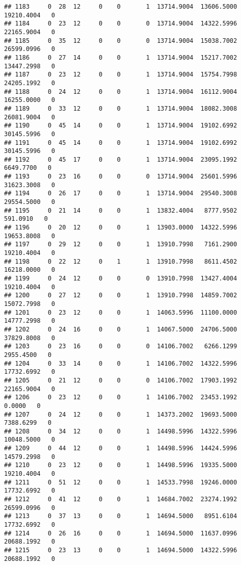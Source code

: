 \documentclass[
]{article}
\begin{document}
\begin{enumerate}
\begin{verbatim}
## 1183     0  28  12     0    0       1  13714.9004  13606.5000  19210.4004   0
## 1184     0  23  12     0    0       0  13714.9004  14322.5996  22165.9004   0
## 1185     0  35  12     0    0       0  13714.9004  15038.7002  26599.0996   0
## 1186     0  27  14     0    0       1  13714.9004  15217.7002  13447.2998   0
## 1187     0  23  12     0    0       1  13714.9004  15754.7998  24205.1992   0
## 1188     0  24  12     0    0       1  13714.9004  16112.9004  16255.0000   0
## 1189     0  33  12     0    0       1  13714.9004  18082.3008  26081.9004   0
## 1190     0  45  14     0    0       1  13714.9004  19102.6992  30145.5996   0
## 1191     0  45  14     0    0       1  13714.9004  19102.6992  30145.5996   0
## 1192     0  45  17     0    0       1  13714.9004  23095.1992   6649.7700   0
## 1193     0  23  16     0    0       0  13714.9004  25601.5996  31623.3008   0
## 1194     0  26  17     0    0       1  13714.9004  29540.3008  29554.5000   0
## 1195     0  21  14     0    0       1  13832.4004   8777.9502    591.0910   0
## 1196     0  20  12     0    0       1  13903.0000  14322.5996  19653.8008   0
## 1197     0  29  12     0    0       1  13910.7998   7161.2900  19210.4004   0
## 1198     0  22  12     0    1       1  13910.7998   8611.4502  16218.0000   0
## 1199     0  24  12     0    0       0  13910.7998  13427.4004  19210.4004   0
## 1200     0  27  12     0    0       1  13910.7998  14859.7002  15072.7998   0
## 1201     0  23  12     0    0       1  14063.5996  11100.0000  14777.2998   0
## 1202     0  24  16     0    0       1  14067.5000  24706.5000  37829.8008   0
## 1203     0  23  16     0    0       0  14106.7002   6266.1299   2955.4500   0
## 1204     0  33  14     0    0       1  14106.7002  14322.5996  17732.6992   0
## 1205     0  21  12     0    0       0  14106.7002  17903.1992  22165.9004   0
## 1206     0  23  12     0    0       1  14106.7002  23453.1992      0.0000   0
## 1207     0  24  12     0    0       1  14373.2002  19693.5000   7388.6299   0
## 1208     0  34  12     0    0       1  14498.5996  14322.5996  10048.5000   0
## 1209     0  44  12     0    0       1  14498.5996  14424.5996  14579.2998   0
## 1210     0  23  12     0    0       1  14498.5996  19335.5000  19210.4004   0
## 1211     0  51  12     0    0       1  14533.7998  19246.0000  17732.6992   0
## 1212     0  41  12     0    0       1  14684.7002  23274.1992  26599.0996   0
## 1213     0  37  13     0    0       1  14694.5000   8951.6104  17732.6992   0
## 1214     0  26  16     0    0       1  14694.5000  11637.0996  20688.1992   0
## 1215     0  23  13     0    0       1  14694.5000  14322.5996  20688.1992   0

\end{verbatim}
\end{enumerate}
\end{document}
